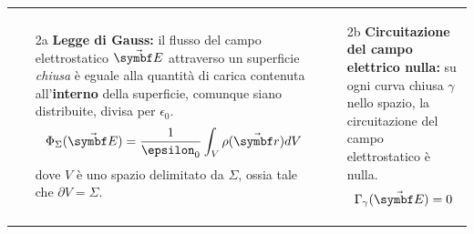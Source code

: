 \begin{remember}
\begin{tabular}{p{}p{}}
			\begin{itemize}
				\item[2a] \textbf{Legge di Gauss:} il flusso del campo elettrostatico $\vba{E}$ attraverso un superficie \textit{chiusa} è eguale alla quantità di carica contenuta all'\textbf{interno} della superficie, comunque siano distribuite, divisa per $\epsilon_0$.
				\begin{equation*}
					\Phi_\Sigma(\vba{E})=\frac{1}{\epsilon_0}\int_{V}\rho(\vba{r})dV
				\end{equation*}
				dove $V$ è uno spazio delimitato da $\Sigma$, ossia tale che $\partial V=\Sigma$.
			\end{itemize} &
			\begin{itemize}
				\item[2b] \textbf{Circuitazione del campo elettrico nulla:} su ogni curva chiusa $\gamma$ nello spazio, la circuitazione del campo elettrostatico è nulla.
				\begin{equation*}
					\Gamma_{\gamma}(\vba{E})=0
				\end{equation*}
			\end{itemize}
		\end{tabular}
\end{remember}
